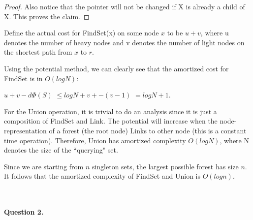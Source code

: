 \documentclass[a4paper, 10pt]{article}
\begin{document}
{\begin{proof}
Also notice that the pointer will not be changed if X is already a child of X. This proves the claim.
\end{proof}

Define the actual cost for FindSet(x) on some node $x$ to be $u + v$, where u denotes the number of heavy nodes and v denotes the number of light nodes on the shortest path from $x$ to $r$.

Using the potential method, we can clearly see that the amortized cost for FindSet is in $O(log N)$:

$u + v - d\Phi(S)$ $ \le log N + v + - (v - 1) $ $ = log N + 1$.

For the Union operation, it is trivial to do an analysis since it is just a composition of FindSet and Link. The potential will increase when the node-representation of a forest (the root node) Links to other node (this is a constant time operation). Therefore, Union has amortized complexity $O(log N)$, where N denotes the size of the ``querying" set.

Since we are starting from $n$ singleton sets, the largest possible forest has size $n$. It follows that the amortized complexity of FindSet and Union is $O(log n)$.

}
~\\\\
{\noindent\large\textbf{Question 2.}}
\end{document}
